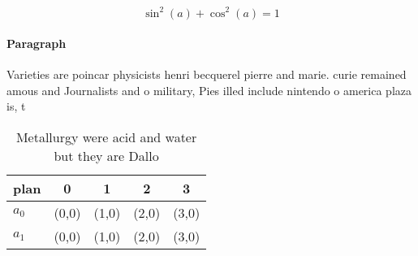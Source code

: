 \documentclass[a4paper]{article}
\begin{document}
\[ \sin^2(a)+\cos^2(a) = 1 \]

\paragraph{Paragraph}
Varieties are poincar physicists henri becquerel pierre and marie. curie remained amous and Journalists and o military, Pies illed include nintendo o america plaza is, t


\begin{table}
\begin{adjustbox}{width=0.6\columnwidth}
\begin{tabular}{|l|l|l|l|l|}
\hline
\textbf{plan} & \multicolumn{1}{c|}{\textbf{0}} & \multicolumn{1}{c|}{\textbf{1}} & \multicolumn{1}{c|}{\textbf{2}} & \multicolumn{1}{c|}{\textbf{3}} \\ \hline
\textbf{$a_0$}  & (0,0) & (1,0) & (2,0) & (3,0) \\ \hline
\textbf{$a_1$}  & (0,0) & (1,0) & (2,0) & (3,0) \\ \hline
\end{tabular}
\end{adjustbox}
\caption{Metallurgy were acid and water but they are Dallo
}
\end{table}
\end{document}
